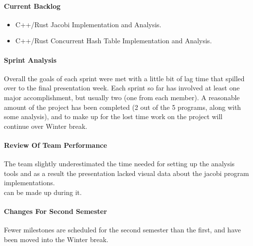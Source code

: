 \documentclass[10pt,a4paper]{report}
\begin{document}
\paragraph{Current Backlog}
\begin{flushleft}
	\begin{itemize}
		\item C++/Rust Jacobi Implementation and Analysis.
		\item C++/Rust Concurrent Hash Table Implementation and Analysis.
	\end{itemize}
\end{flushleft}
\paragraph{Sprint Analysis}
Overall the goals of each sprint were met with a little bit of lag time that
spilled over to the final presentation week. Each sprint so far has involved at least one major accomplishment, but usually
two (one from each member). A reasonable amount of the project
has been completed (2 out of the 5 programs, along with some analysis), and to
make up for the lost time work on the project will continue over Winter break.
\paragraph{Review Of Team Performance}
The team slightly underestimated the time needed for setting up the analysis
tools and as a result the presentation lacked visual data about the jacobi
program implementations.
\\
can be made up during it.
\paragraph{Changes For Second Semester}
Fewer milestones are scheduled for the second semester than the first, and have
been moved into the Winter break.
\end{document}
